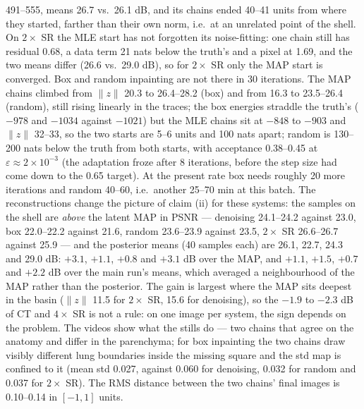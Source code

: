 \documentclass[11pt]{article}
\begin{document}
\begin{itemize}
        491--555, means 26.7 vs.\ 26.1 dB, and its chains ended 40--41
        units from where they started, farther than their own norm, i.e.\
        at an unrelated point of the shell. On $2\times$ SR the MLE start
        has not forgotten its noise-fitting: one chain still has residual
        0.68, a data term 21 nats below the truth's and a pixel at 1.69,
        and the two means differ (26.6 vs.\ 29.0 dB), so for $2\times$ SR
        only the MAP start is converged. Box and random inpainting are not
        there in 30 iterations. The MAP chains climbed from $\|z\|$ 20.3
        to 26.4--28.2 (box) and from 16.3 to 23.5--26.4 (random), still
        rising linearly in the traces; the box energies straddle the
        truth's ($-978$ and $-1034$ against $-1021$) but the MLE chains
        sit at $-848$ to $-903$ and $\|z\|$ 32--33, so the two starts are
        5--6 units and 100 nats apart; random is 130--200 nats below the
        truth from both starts, with acceptance 0.38--0.45 at
        $\varepsilon \approx 2 \times 10^{-3}$ (the adaptation froze after
        8 iterations, before the step size had come down to the 0.65
        target). At the present rate box needs roughly 20 more
        iterations and random 40--60, i.e.\ another 25--70 min at this
        batch. The reconstructions change the picture of claim (ii) for
        these systems: the samples on the shell are \emph{above} the
        latent MAP in PSNR --- denoising 24.1--24.2 against 23.0, box
        22.0--22.2 against 21.6, random 23.6--23.9 against 23.5, $2\times$
        SR 26.6--26.7 against 25.9 --- and the posterior means (40 samples
        each) are 26.1, 22.7, 24.3 and 29.0 dB: $+3.1$, $+1.1$, $+0.8$ and
        $+3.1$ dB over the MAP, and $+1.1$, $+1.5$, $+0.7$ and $+2.2$ dB
        over the main run's means, which averaged a neighbourhood of the
        MAP rather than the posterior. The gain is largest where the MAP
        sits deepest in the basin ($\|z\|$ 11.5 for $2\times$ SR, 15.6
        for denoising), so the $-1.9$ to $-2.3$ dB of CT and $4\times$ SR
        is not a rule: on one image per system, the sign depends on the
        problem. The videos show what the stills do --- two chains that
        agree on the anatomy and differ in the parenchyma; for box
        inpainting the two chains draw visibly different lung boundaries
        inside the missing square and the std map is confined to it
        (mean std 0.027, against 0.060 for denoising, 0.032 for random
        and 0.037 for $2\times$ SR). The RMS distance between the two
        chains' final images is 0.10--0.14 in $[-1, 1]$ units.

\end{itemize}
\end{document}
